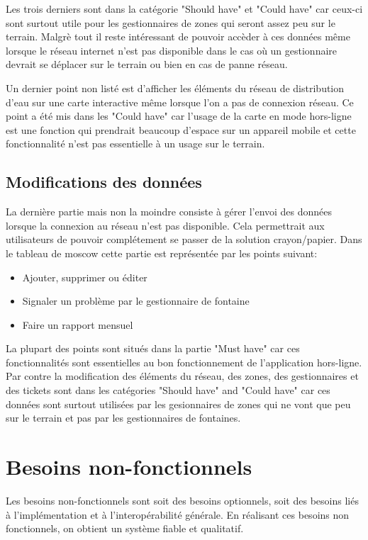 \documentclass{EPL-master-thesis-covers-FR}
\begin{document}
				Les trois derniers sont dans la catégorie "Should have" et "Could have" car ceux-ci sont surtout utile pour les gestionnaires de zones qui seront assez peu sur le terrain. Malgrè tout il reste intéressant de pouvoir accèder à ces données même lorsque le réseau internet n'est pas disponible dans le cas où un gestionnaire devrait se déplacer sur le terrain ou bien en cas de panne réseau.
				
				Un dernier point non listé est d'afficher les éléments du réseau de distribution d'eau sur une carte interactive même lorsque l'on a pas de connexion réseau. Ce point a été mis dans les "Could have" car l'usage de la carte en mode hors-ligne est une fonction qui prendrait beaucoup d'espace sur un appareil mobile et cette fonctionnalité n'est pas essentielle à un usage sur le terrain.

			\subsection*{Modifications des données}
				\label{sec:gest_donnee}
				La dernière partie mais non la moindre consiste à gérer l'envoi des données lorsque la connexion au réseau n'est pas disponible. Cela permettrait aux utilisateurs de pouvoir complétement se passer de la solution crayon/papier.
				Dans le tableau de moscow cette partie est représentée par les points suivant:
				\begin{itemize}
					\item Ajouter, supprimer ou éditer
					\item Signaler un problème par le gestionnaire de fontaine
					\item Faire un rapport mensuel
				\end{itemize}
				
				La plupart des points sont situés dans la partie "Must have" car ces fonctionnalités sont essentielles au bon fonctionnement de l'application hors-ligne. Par contre la modification des éléments du réseau, des zones, des gestionnaires et des tickets sont dans les catégories "Should have" and "Could have" car ces données sont surtout utilisées par les gesionnaires de zones qui ne vont que peu sur le terrain et pas par les gestionnaires de fontaines.			

		\section{Besoins non-fonctionnels}
			Les besoins non-fonctionnels sont soit des besoins optionnels, soit des besoins liés à l'implémentation et à l'interopérabilité générale. En réalisant ces besoins non fonctionnels, on obtient un système fiable et qualitatif.
					
\end{document}
